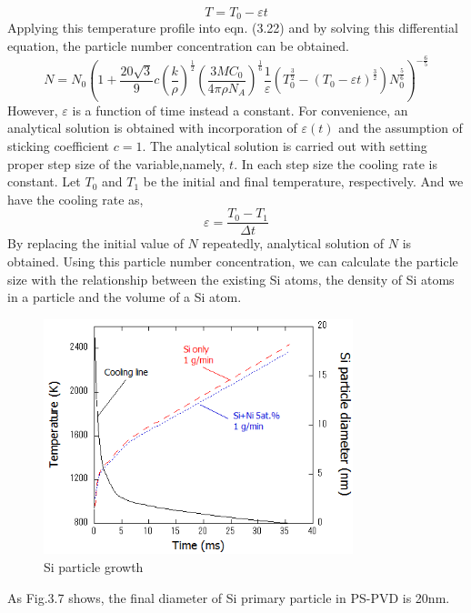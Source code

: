 \begin{equation}
T=T_{0}-\varepsilon t
\tag{3.1.23}
\end{equation}
Applying this temperature profile into eqn. (3.22) and by solving this differential equation, the particle number concentration can be obtained.
\begin{equation}
N=N_{0}\left(1+\frac{20 \sqrt{3}}{9} c\left(\frac{k}{\rho}\right)^{\frac{1}{2}}\left(\frac{3 M C_{0}}{4 \pi \rho N_{A}}\right)^{\frac{1}{6}} \frac{1}{\varepsilon}\left(T_{0}^{\frac{3}{2}}-\left(T_{0}-\varepsilon t\right)^{\frac{3}{2}}\right) N_{0}^{\frac{5}{6}}\right)^{-\frac{6}{5}}
\tag{3.1.24}
\end{equation}
However, $\varepsilon $ is a function of time instead a constant. For convenience, an analytical solution is obtained with incorporation of $\varepsilon (t)$ and the assumption of sticking coefficient $c=1$.
The analytical solution  is carried out with setting proper step size of the variable,namely, $t$. In each step size the cooling rate is constant. Let $T_{0}$ and  $T_{1}$ be the initial and final temperature, respectively. And we have the cooling rate as,
\begin{equation}
\varepsilon=\frac{T_{0}-T_{1}}{\Delta t}
\tag{3.1.25}
\end{equation}
By replacing the initial value of $N$ repeatedly, analytical solution of $N$ is obtained. 
Using this particle number concentration, we can calculate the particle size with the relationship between the existing Si atoms, the density of Si atoms in a particle and the volume of a Si atom.
\begin{figure}[H]
\centering
\includegraphics[width=9cm]{src/fig/fig36..png}
\caption{Si particle growth}
\end{figure}
As Fig.3.7 shows, the final diameter of Si primary particle in PS-PVD is 20nm.

